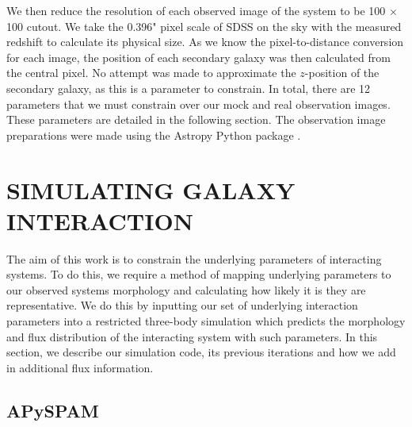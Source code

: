 We then reduce the resolution of each observed image of the system to be 100 $\times$ 100 cutout. We take the 0.396" pixel scale of SDSS on the sky with the measured redshift to calculate its physical size. As we know the pixel-to-distance conversion for each image, the position of each secondary galaxy was then calculated from the central pixel. No attempt was made to approximate the $z$-position of the secondary galaxy, as this is a parameter to constrain. In total, there are 12 parameters that we must constrain over our mock and real observation images. These parameters are detailed in the following section. The observation image preparations were made using the Astropy Python package \citep{astropy_2013, astropy_2018}.

\section{SIMULATING GALAXY INTERACTION}\label{Methods: sims}
\noindent The aim of this work is to constrain the underlying parameters of interacting systems. To do this, we require a method of mapping underlying parameters to our observed systems morphology and calculating how likely it is they are representative. We do this by inputting our set of underlying interaction parameters into a restricted three-body simulation which predicts the morphology and flux distribution of the interacting system with such parameters. In this section, we describe our simulation code, its previous iterations and how we add in additional flux information.

\subsection{APySPAM}\label{sec:simulations}
